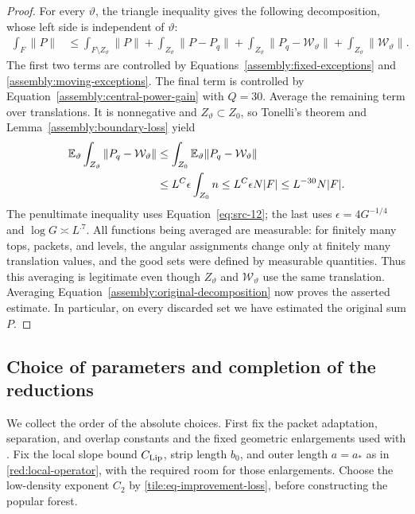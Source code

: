 \begin{proof}
For every \(\vartheta\), the triangle inequality gives the following
decomposition, whose left side is independent of \(\vartheta\):
\begin{align}
 \int_F\|P\|
 &\le \int_{F\setminus Z_\vartheta}\|P\|
      +\int_{Z_\vartheta}\|P-P_q\|
      +\int_{Z_\vartheta}\|P_q-\mathcal W_\vartheta\|
      +\int_{Z_\vartheta}\|\mathcal W_\vartheta\|.
 \label{assembly:original-decomposition}
\end{align}
The first two terms are controlled by
Equations~\eqref{assembly:fixed-exceptions} and
\eqref{assembly:moving-exceptions}.  The final term is controlled by
Equation~\eqref{assembly:central-power-gain} with \(Q=30\).
Average the remaining term over translations.  It is nonnegative and
\(Z_\vartheta\subset Z_0\), so Tonelli's theorem and
Lemma~\ref{assembly:boundary-loss} yield
\begin{align*}
 \mathbb E_\vartheta\int_{Z_\vartheta}
       \|P_q-\mathcal W_\vartheta\|
 &\le\int_{Z_0}\mathbb E_\vartheta
       \|P_q-\mathcal W_\vartheta\|\\
 &\le L^C\epsilon\int_{Z_0}n
 \le L^C\epsilon N|F|
 \le L^{-30}N|F|.
\end{align*}
The penultimate inequality uses Equation~\eqref{eq:src-12}; the last
uses \(\epsilon=4G^{-1/4}\) and \(\log G\asymp L^{.7}\).
All functions being averaged are measurable: for finitely many tops,
packets, and levels, the angular assignments change only at finitely
many translation values, and the good sets were defined by measurable
quantities.  Thus this averaging is legitimate even though
\(Z_\vartheta\) and \(\mathcal W_\vartheta\) use the same
translation.  Averaging Equation~\eqref{assembly:original-decomposition}
now proves the asserted estimate.  In particular, on every discarded
set we have estimated the original sum \(P\).
\end{proof}

\subsection{Choice of parameters and completion of the reductions}

We collect the order of the absolute choices.  First fix the packet
adaptation, separation, and overlap constants and the fixed geometric
enlargements used with .  Fix the local slope bound
\(C_{\rm Lip}\), strip length \(b_0\), and outer length \(a=a_*\)
as in \eqref{red:local-operator}, with the required room for those
enlargements.  Choose the low-density exponent \(C_2\) by
\eqref{tile:eq-improvement-loss}, before constructing the popular forest.

